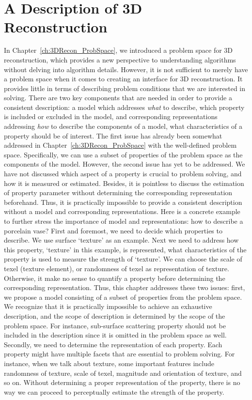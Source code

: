 
\chapter{A Description of 3D Reconstruction}
\label{ch:3DRecon_Desc}
In Chapter~\ref{ch:3DRecon_ProbSpace}, we introduced a problem space for 3D reconstruction, which provides a new perspective to understanding algorithms without delving into algorithm details. However, it is not sufficient to merely have a problem space when it comes to creating an interface for 3D reconstruction. It provides little in terms of describing problem conditions that we are interested in solving. There are two key components that are needed in order to provide a consistent description: a model which addresses \textit{what} to describe, \ie which property is included or excluded in the model, and corresponding representations addressing \textit{how} to describe the components of a model, \ie what characteristics of a property should be of interest. The first issue has already been somewhat addressed in Chapter~\ref{ch:3DRecon_ProbSpace} with the well-defined problem space. Specifically, we can use a subset of properties of the problem space as the components of the model. However, the second issue has yet to be addressed. We have not discussed which aspect of a property is crucial to problem solving, and how it is measured or estimated. Besides, it is pointless to discuss the estimation of property parameter without determining the corresponding representation beforehand. Thus, it is practically impossible to provide a consistent description without a model and corresponding representations. Here is a concrete example to further stress the importance of model and representations: how to describe a porcelain vase? First and foremost, we need to decide which properties to describe. We use surface `texture' as an example. Next we need to address how this property, `texture' in this example, is represented, \ie what characteristics of the property is used to measure the strength of `texture'. We can choose the scale of texel (texture element), or randomness of texel as representation of texture. Otherwise, it make no sense to quantify a property before determining the corresponding representation. Thus, this chapter addresses these two issues: first, we propose a model consisting of a subset of properties from the problem space. We recognize that it is practically impossible to achieve an exhaustive description, and the scope of description is determined by the scope of the problem space. For instance, sub-surface scattering property should not be included in the description since it is omitted in the problem space as well. Secondly, we need to determine the representation of each property. Each property might have multiple facets that are essential to problem solving. For instance, when we talk about texture, some important features include randomness of texture, scale of texel, magnitude and orientation of texture, and so on. Without determining a proper representation of the property, there is no way we can proceed to perceptually estimate the strength of the property.

